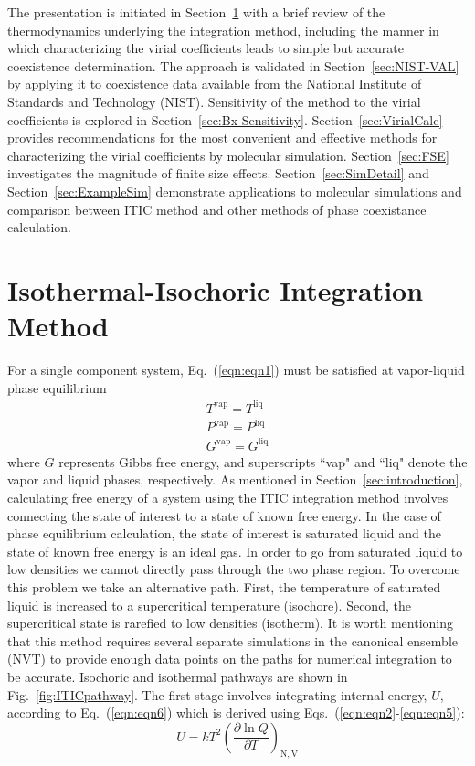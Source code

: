 \documentclass[5p,times]{elsarticle}
\begin{document}
The presentation is initiated in Section~\ref{sec:ITIC-method} with a brief review of the thermodynamics underlying the integration method, including the manner in which characterizing the virial coefficients leads to simple but accurate coexistence determination. The approach is validated in Section~\ref{sec:NIST-VAL} by applying it to coexistence data available from the National Institute of Standards and Technology (NIST). Sensitivity of the method to the virial coefficients is explored in Section~\ref{sec:Bx-Sensitivity}. Section~\ref{sec:VirialCalc} provides recommendations for the most convenient and effective methods for characterizing the virial coefficients by molecular simulation. 
Section~\ref{sec:FSE} investigates the magnitude of finite size effects. 
Section~\ref{sec:SimDetail} and Section~\ref{sec:ExampleSim} demonstrate applications to molecular simulations and comparison between ITIC method and other methods of phase coexistance calculation.

\section{Isothermal-Isochoric Integration Method} \label{sec:ITIC-method}
For a single component system, Eq.~(\ref{eqn:eqn1}) must be satisfied at vapor-liquid phase equilibrium
\begin{equation}
\begin{array}{l} {T^{\mathrm{vap}} =T^{\mathrm{liq}} } \\ {P^{\mathrm{vap}} =P^{\mathrm{liq}} } \\ {G^{\mathrm{vap}} =G^{\mathrm{liq}} } \end{array} \label{eqn:eqn1}
\end{equation}
where $G$ represents Gibbs free energy, and superscripts ``vap" and ``liq" denote the vapor and liquid phases, respectively. As mentioned in Section~\ref{sec:introduction}, calculating free energy of a system using the ITIC integration method involves connecting the state of interest to a state of known free energy. In the case of phase equilibrium calculation, the state of interest is saturated liquid and the state of known free energy is an ideal gas. In order to go from saturated liquid to low densities we cannot directly pass through the two phase region. To overcome this problem we take an alternative path. First, the temperature of saturated liquid is increased to a supercritical temperature (isochore). Second, the supercritical state is rarefied to low densities (isotherm). It is worth mentioning that this method requires several separate simulations in the canonical ensemble (NVT) to provide enough data points on the paths for numerical integration to be accurate. Isochoric and isothermal pathways are shown in Fig.~\ref{fig:ITICpathway}. The first stage involves integrating internal energy, $U$, according to Eq.~(\ref{eqn:eqn6}) which is derived using Eqs.~(\ref{eqn:eqn2}-\ref{eqn:eqn5}):
\begin{equation}
U=kT^{2} \left( \frac{\partial \ln Q}{\partial T}\right) _{\mathrm N,\mathrm V}  \label{eqn:eqn2}
\end{equation}
\end{document}
